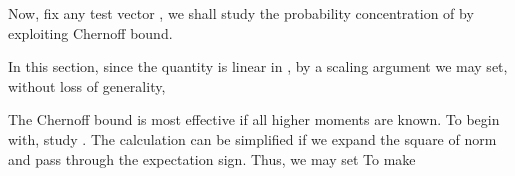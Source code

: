 Now, fix any test vector , we shall study the probability concentration of
by exploiting Chernoff bound.

In this section, since the quantity  is linear in , by a scaling argument we may set, without loss of generality,

\stopsubsection

\startsubsection [title={The First Moment}]

The Chernoff bound is most effective if all higher moments are known.
To begin with, study .
The calculation can be simplified if we expand the square of norm and pass through the expectation sign.
Thus, we may set
To make

\stopsubsection

\startsubsection [title={The Second Moment}]

